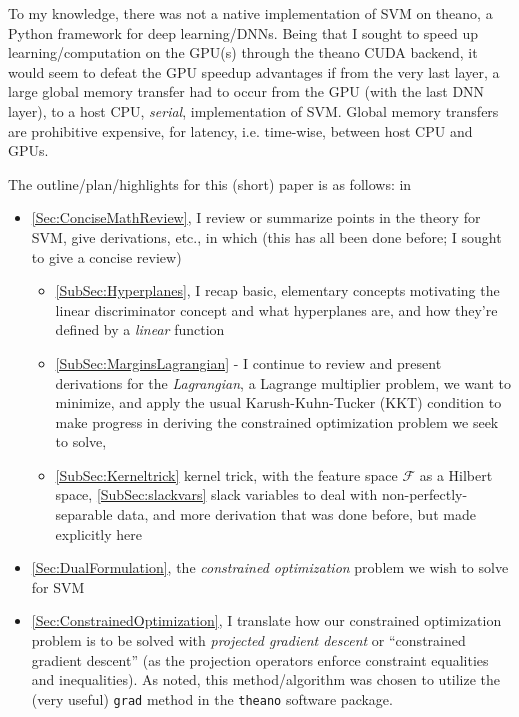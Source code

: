 \documentclass[10pt]{amsart}
\begin{document}
\begin{multicols*}{2}
To my knowledge, there was not a native implementation of SVM on theano, a Python framework for deep learning/DNNs.  Being that I sought to speed up learning/computation on the GPU(s) through the theano CUDA backend, it would seem to defeat the GPU speedup advantages if from the very last layer, a large global memory transfer had to occur from the GPU (with the last DNN layer), to a host CPU, \emph{serial}, implementation of SVM.  Global memory transfers are prohibitive expensive, for latency, i.e. time-wise, between host CPU and GPUs.\cite{CS344}    

The outline/plan/highlights for this (short) paper is as follows: in
\begin{itemize}
\item \ref{Sec:ConciseMathReview}, I review or summarize points in the theory for SVM, give derivations, etc., in which (this has all been done before; I sought to give a concise review)
  \begin{itemize}
\item \ref{SubSec:Hyperplanes}, I recap basic, elementary concepts motivating the linear discriminator concept and what hyperplanes are, and how they're defined by a \emph{linear} function
\item \ref{SubSec:MarginsLagrangian} - I continue to review and present derivations for the \emph{Lagrangian}, a Lagrange multiplier problem, we want to minimize, and apply the usual Karush-Kuhn-Tucker (KKT) condition to make progress in deriving the constrained optimization problem we seek to solve,
\item \ref{SubSec:Kerneltrick} kernel trick, with the feature space $\mathcal{F}$ as a Hilbert space, \ref{SubSec:slackvars} slack variables to deal with non-perfectly-separable data, and more derivation that was done before, but made explicitly here
\end{itemize}
\item \ref{Sec:DualFormulation}, the \emph{constrained optimization} problem we wish to solve for SVM
\item \ref{Sec:ConstrainedOptimization}, I translate how our constrained optimization problem is to be solved with \emph{projected gradient descent} or ``constrained gradient descent'' (as the projection operators enforce constraint equalities and inequalities).  As noted, this method/algorithm was chosen to utilize the (very useful) \verb|grad| method in the \verb|theano| software package.


\end{itemize}
\end{multicols*}
\end{document}
